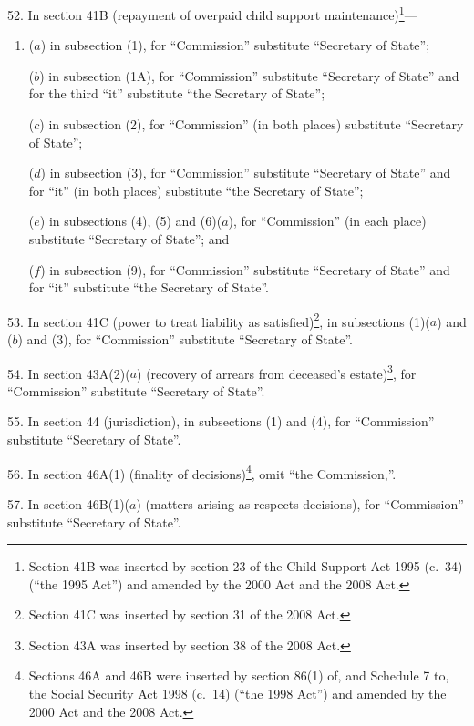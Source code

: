 \documentclass[12pt,a4paper]{article}
\begin{document}
52.  In section 41B (repayment of overpaid child support maintenance)\footnote{Section 41B was inserted by section 23 of the Child Support Act 1995 (c.~34) (“the 1995 Act”) and amended by the 2000 Act and the 2008 Act.}—
\begin{enumerate}\item[]
($a$) in subsection (1), for “Commission” substitute “Secretary of State”;

($b$) in subsection (1A), for “Commission” substitute “Secretary of State” and for the third “it” substitute “the Secretary of State”;

($c$) in subsection (2), for “Commission” (in both places) substitute “Secretary of State”;

($d$) in subsection (3), for “Commission” substitute “Secretary of State” and for “it” (in both places) substitute “the Secretary of State”;

($e$) in subsections (4), (5) and (6)($a$), for “Commission” (in each place) substitute “Secretary of State”; and

($f$) in subsection (9), for “Commission” substitute “Secretary of State” and for “it” substitute “the Secretary of State”.
\end{enumerate}

\medskip

53.  In section 41C (power to treat liability as satisfied)\footnote{Section 41C was inserted by section 31 of the 2008 Act.}, in subsections (1)($a$)  and ($b$)  and (3), for “Commission” substitute “Secretary of State”.

\medskip

54.  In section 43A(2)($a$)  (recovery of arrears from deceased’s estate)\footnote{Section 43A was inserted by section 38 of the 2008 Act.}, for “Commission” substitute “Secretary of State”.

\medskip

55.  In section 44 (jurisdiction), in subsections (1) and (4), for “Commission” substitute “Secretary of State”.

\medskip

56.  In section 46A(1) (finality of decisions)\footnote{Sections 46A and 46B were inserted by section 86(1) of, and Schedule 7 to, the Social Security Act 1998 (c.~14) (“the 1998 Act”) and amended by the 2000 Act and the 2008 Act.}, omit “the Commission,”.

\medskip

57.  In section 46B(1)($a$)  (matters arising as respects decisions), for “Commission” substitute “Secretary of State”.
\end{document}
